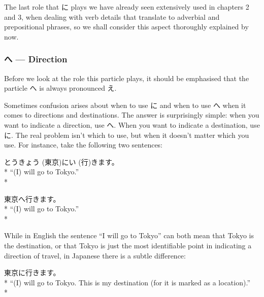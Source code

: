 \documentclass[11pt, b5paper, twoside, openright, onecolumn]{book}
\makeatletter
\newcommand*{\rubystack}[2]{{\relscale{0.5}%
  \begin{tabular}[b]{@{}c@{}}%
    {#1}\\%
   {\textscale{2}{#2}}%
  \end{tabular}}%
}
\DeclareRobustCommand*{\ruby}[2]{%
  \mbox{%
    \setlength{\parskip}{0ex}%
    \BeginAccSupp{method=pdfstringdef,ActualText={#1}}%
      \rubystack{\phantom{#2}}{#1}%
      \llap{%
        \rubystack{#2}{\phantom{#1}}%
      }%
    \EndAccSupp{}%
  }%
}
\renewcommand*{\ruby}[2]{#2 (#1)}%
\newenvironment{exampleblock}{
\setlength{\parindent}{0.6in}
\begin{minipage}[t]{\dimexpr\textwidth-\parindent}}
{\end{minipage}}
\makeatother
\begin{document}
The last role that に plays we have already seen extensively used in chapters 2 and 3‚ when dealing with verb details that translate to adverbial and prepositional phrases‚ so we shall consider this aspect thoroughly explained by now.

\subsubsection{へ — Direction}

Before we look at the role this particle plays‚ it should be emphasised that the particle へ is always pronounced え.

Sometimes confusion arises about when to use に and when to use へ when it comes to directions and destinations. The answer is surprisingly simple: when you want to indicate a direction‚ use へ. When you want to indicate a destination‚ use に. The real problem isn’t which to use‚ but when it doesn’t matter which you use. For instance‚ take the following two sentences:

\vspace{0.4cm}
\begin{exampleblock}
\ruby{東京}{とうきょう}に\ruby{行}{い}きます。 \\* 
“(I) will go to Tokyo.” \\* 
\end{exampleblock}
\vspace{0.2cm}

\begin{exampleblock}
東京へ行きます。 \\* 
“(I) will go to Tokyo.” \\* 
\end{exampleblock}
\vspace{0.2cm}

While in English the sentence “I will go to Tokyo” can both mean that Tokyo is the destination‚ or that Tokyo is just the most identifiable point in indicating a direction of travel‚ in Japanese there is a subtle difference:

\vspace{0.4cm}
\begin{exampleblock}
東京に行きます。 \\* 
“(I) will go to Tokyo. This is my destination (for it is marked as a location).” \\* 
\end{exampleblock}
\vspace{0.2cm}
\end{document}
